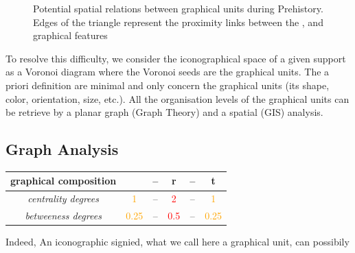 \documentclass[article]{jss}
\newcommand{\fct}[1]{\code{#1()}}
\begin{document}
\begin{figure}[H]
\centering
{}
\caption{Potential spatial relations between graphical units during Prehistory. Edges of the triangle represent the proximity links between the ,  and  graphical features} \label{fig:triangle}
\end{figure}

To resolve this difficulty, we consider the iconographical space of a given support as a Voronoi diagram where the Voronoi seeds are the graphical units. The a priori definition are minimal and only concern the graphical units (its shape, color, orientation, size, etc.). All the organisation levels of the graphical units can be retrieve by a planar graph (Graph Theory) and a spatial (GIS) analysis.

\subsection[Graph Analysis]{Graph Analysis} \label{sec:graph}


\begin{center}
 \begin{tabular}{|c c c c c c|} 
 \hline
 graphical composition & \code{a & -- & r & -- & t} \\ 
 \hline
 \emph{centrality degrees} & \textcolor{orange}{1} & -- & \textcolor{red}{2} & -- & \textcolor{orange}{1} \\ 
 \emph{betweeness degrees} & \textcolor{orange}{0.25} & -- & \textcolor{red}{0.5} & -- & \textcolor{orange}{0.25} \\
 \hline
\end{tabular}
\end{center}


Indeed,  
An iconographic signied, what we call here a graphical unit, can possibily 

\end{document}
